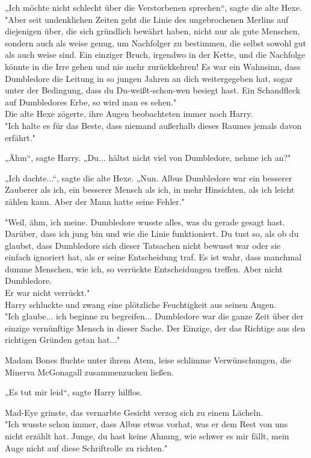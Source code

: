 {„Ich möchte nicht schlecht über die Verstorbenen sprechen“, sagte die alte Hexe.\\ "Aber seit undenklichen Zeiten geht die Linie des ungebrochenen Merlins auf diejenigen über, die sich gründlich bewährt haben, nicht nur als gute Menschen, sondern auch als weise genug, um Nachfolger zu bestimmen, die selbst sowohl gut als auch weise sind. Ein einziger Bruch, irgendwo in der Kette, und die Nachfolge könnte in die Irre gehen und nie mehr zurückkehren! Es war ein Wahnsinn, dass Dumbledore die Leitung in so jungen Jahren an dich weitergegeben hat, sogar unter der Bedingung, dass du Du-weißt-schon-wen besiegt hast. Ein Schandfleck auf Dumbledores Erbe, so wird man es sehen."\\ Die alte Hexe zögerte, ihre Augen beobachteten immer noch Harry.\\ "Ich halte es für das Beste, dass niemand außerhalb dieses Raumes jemals davon erfährt."

„Ähm“, sagte Harry. „Du... hältst nicht viel von Dumbledore, nehme ich an?"

„Ich dachte...“, sagte die alte Hexe. „Nun. Albus Dumbledore war ein besserer Zauberer als ich, ein besserer Mensch als ich, in mehr Hinsichten, als ich leicht zählen kann. Aber der Mann hatte seine Fehler."

"Weil, ähm, ich meine. Dumbledore wusste alles, was du gerade gesagt hast.\\ Darüber, dass ich jung bin und wie die Linie funktioniert. Du tust so, als ob du glaubst, dass Dumbledore sich dieser Tatsachen nicht bewusst war oder sie einfach ignoriert hat, als er seine Entscheidung traf. Es ist wahr, dass manchmal dumme Menschen, wie ich, so verrückte Entscheidungen treffen. Aber nicht Dumbledore.\\ Er war nicht verrückt."\\ Harry schluckte und zwang eine plötzliche Feuchtigkeit aus seinen Augen.\\ "Ich glaube... ich beginne zu begreifen... Dumbledore war die ganze Zeit über der einzige vernünftige Mensch in dieser Sache. Der Einzige, der das Richtige aus den richtigen Gründen getan hat..."

Madam Bones fluchte unter ihrem Atem, leise schlimme Verwünschungen, die Minerva McGonagall zusammenzucken ließen.

„Es tut mir leid“, sagte Harry hilflos.

Mad-Eye grinste, das vernarbte Gesicht verzog sich zu einem Lächeln.\\ "Ich wusste schon immer, dass Albus etwas vorhat, was er dem Rest von uns nicht erzählt hat. Junge, du hast keine Ahnung, wie schwer es mir fällt, mein Auge nicht auf diese Schriftrolle zu richten."

}

